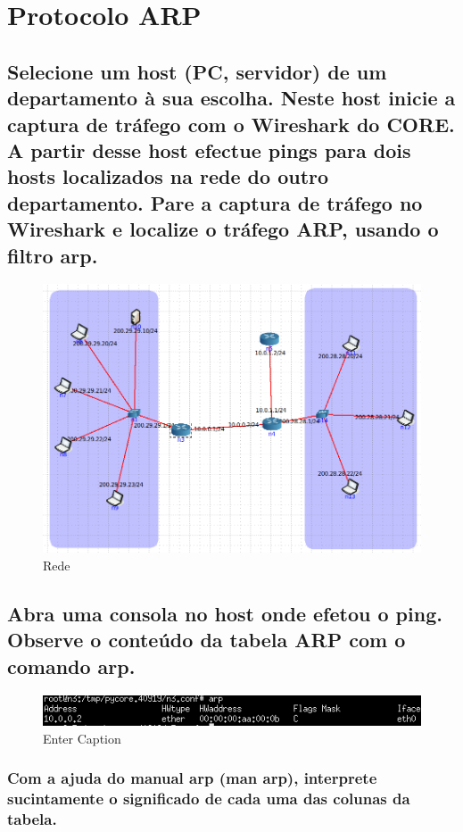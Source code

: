 \section{Protocolo ARP}
\subsection*{Selecione um host (PC, servidor) de um departamento à sua escolha. Neste host inicie a
captura de tráfego com o Wireshark do CORE. A partir desse host efectue pings para dois
hosts localizados na rede do outro departamento. Pare a captura de tráfego no
Wireshark e localize o tráfego ARP, usando o filtro arp.}

\begin{figure} [h]
    \centering
    \includegraphics[width=0.8\linewidth]{images/ligacoes-routers.png}
    \caption{Rede}
    \label{fig:enter-label}
\end{figure}

\subsection{Abra uma consola no host onde efetou o ping. Observe o conteúdo da tabela ARP com o comando arp.}

\begin{figure} [h]
    \centering
    \includegraphics[width=0.8\linewidth]{images/dois-pings-tabela-arp.png}
    \caption{Enter Caption}
    \label{fig:enter-label}
\end{figure}

\subsubsection{Com a ajuda do manual arp (man arp), interprete sucintamente o significado de cada uma das colunas da tabela.}

